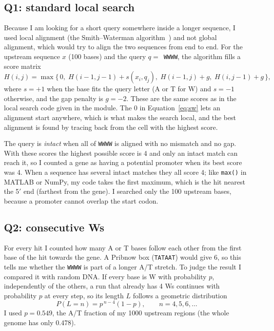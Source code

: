 \documentclass[11pt,a4paper]{article}
\newcommand{\seqs}[1]{\texttt{#1}}
\begin{document}
\subsection{Q1: standard local search}
Because I am looking for a short query somewhere inside a longer sequence, I used local alignment
(the Smith--Waterman algorithm~\cite{sw}) and not global alignment, which would try to align the two
sequences from end to end. For the upstream sequence $x$ (100 bases) and the query $q=$~\seqs{WWWW},
the algorithm fills a score matrix
\begin{equation}
H(i,j)=\max\{\,0,\; H(i-1,j-1)+s(x_i,q_j),\; H(i-1,j)+g,\; H(i,j-1)+g\,\},
\label{eq:sw}
\end{equation}
where $s=+1$ when the base fits the query letter (A or T for W) and $s=-1$ otherwise, and the gap
penalty is $g=-2$. These are the same scores as in the local search code given in the module. The 0
in Equation~\eqref{eq:sw} lets an alignment start anywhere, which is what makes the search local, and
the best alignment is found by tracing back from the cell with the highest score.

The query is \emph{intact} when all of \seqs{WWWW} is aligned with no mismatch and no gap. With these
scores the highest possible score is 4 and only an intact match can reach it, so I counted a gene as
having a potential promoter when its best score was 4. When a sequence has several intact matches
they all score 4; like \texttt{max()} in MATLAB or NumPy, my code takes the first maximum, which is
the hit nearest the 5$'$ end (farthest from the gene). I searched only the 100 upstream bases,
because a promoter cannot overlap the start codon.

\subsection{Q2: consecutive Ws}
For every hit I counted how many A or T bases follow each other from the first base of the hit
towards the gene. A Pribnow box (\seqs{TATAAT}) would give 6, so this tells me whether the
\seqs{WWWW} is part of a longer A/T stretch. To judge the result I compared it with random DNA. If
every base is W with probability $p$, independently of the others, a run that already has 4 Ws
continues with probability $p$ at every step, so its length $L$ follows a geometric distribution
\begin{equation}
P(L=n)=p^{\,n-4}(1-p),\qquad n=4,5,6,\ldots
\label{eq:geo}
\end{equation}
I used $p=0.549$, the A/T fraction of my 1000 upstream regions (the whole genome has only 0.478).
\end{document}
